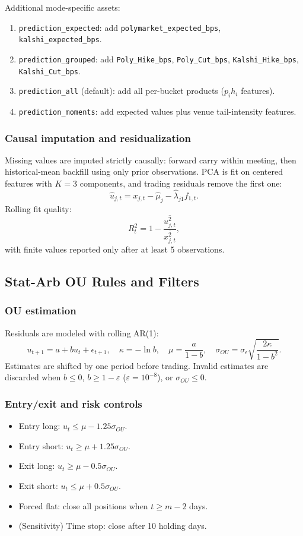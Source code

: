 Additional mode-specific assets:
\begin{enumerate}
    \item \texttt{prediction\_expected}: add \texttt{polymarket\_expected\_bps}, \texttt{kalshi\_expected\_bps}.
    \item \texttt{prediction\_grouped}: add \texttt{Poly\_Hike\_bps}, \texttt{Poly\_Cut\_bps}, \texttt{Kalshi\_Hike\_bps}, \texttt{Kalshi\_Cut\_bps}.
    \item \texttt{prediction\_all} (default): add all per-bucket products ($p_i h_i$ features).
    \item \texttt{prediction\_moments}: add expected values plus venue tail-intensity features.
\end{enumerate}

\subsubsection*{Causal imputation and residualization}
Missing values are imputed strictly causally: forward carry within meeting, then
historical-mean backfill using only prior observations. PCA is fit on centered
features with $K=3$ components, and trading residuals remove the first one:
\[
\hat{u}_{j,t}=x_{j,t}-\hat{\mu}_j-\hat{\lambda}_{j1}f_{1,t}.
\]
Rolling fit quality:
\[
R_t^2=1-\frac{\overline{u_{j,t}^2}}{\overline{x_{j,t}^2}},
\]
with finite values reported only after at least 5 observations.

\subsection{Stat-Arb OU Rules and Filters}
\label{app:statarb_ou_rules}

\subsubsection*{OU estimation}
Residuals are modeled with rolling AR(1):
\[
u_{t+1}=a+b u_t+\epsilon_{t+1},\quad
\kappa=-\ln b,\quad
\mu=\frac{a}{1-b},\quad
\sigma_{OU}=\sigma_{\epsilon}\sqrt{\frac{2\kappa}{1-b^2}}.
\]
Estimates are shifted by one period before trading. Invalid estimates are
discarded when $b\le0$, $b\ge1-\varepsilon$ ($\varepsilon=10^{-8}$), or
$\sigma_{OU}\le0$.

\subsubsection*{Entry/exit and risk controls}
\begin{itemize}
    \item Entry long: $u_t \le \mu-1.25\sigma_{OU}$.
    \item Entry short: $u_t \ge \mu+1.25\sigma_{OU}$.
    \item Exit long: $u_t \ge \mu-0.5\sigma_{OU}$.
    \item Exit short: $u_t \le \mu+0.5\sigma_{OU}$.
    \item Forced flat: close all positions when $t \ge m-2$ days.
    \item (Sensitivity) Time stop: close after 10 holding days.
\end{itemize}

